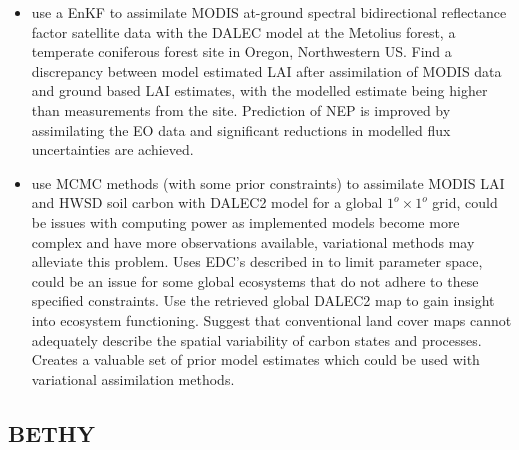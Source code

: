 \documentclass[12pt, a4paper]{article}
\begin{document}
\begin{itemize}
\item \citet{Quaife2008} use a EnKF to assimilate MODIS at-ground spectral bidirectional reflectance factor satellite data with the DALEC model at the Metolius forest, a temperate coniferous forest site in Oregon, Northwestern US. Find a discrepancy between model estimated LAI after assimilation of MODIS data and ground based LAI estimates, with the modelled estimate being higher than measurements from the site. Prediction of NEP is improved by assimilating the EO data and significant reductions in modelled flux uncertainties are achieved.    

\item \citet{bloom2016decadal} use MCMC methods (with some prior constraints) to assimilate MODIS LAI and HWSD soil carbon with DALEC2 model for a global \(1^o \times 1^o\) grid, could be issues with computing power as implemented models become more complex and have more observations available, variational methods may alleviate this problem. Uses EDC's described in \citet{Bloom2015} to limit parameter space, could be an issue for some global ecosystems that do not adhere to these specified constraints. Use the retrieved global DALEC2 map to gain insight into ecosystem functioning. Suggest that conventional land cover maps cannot adequately describe  the spatial variability of carbon states and processes. Creates a valuable set of prior model estimates which could be used with variational assimilation methods.

\end{itemize}


\subsection{BETHY}
\end{document}
